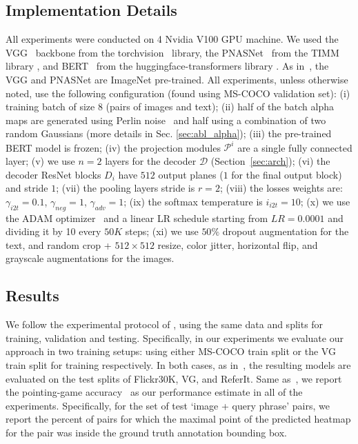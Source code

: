 \documentclass[10pt,twocolumn,letterpaper]{article}
\newcommand\secvspace{\vspace{-0.0cm}}
\begin{document}
\subsection{Implementation Details}\label{sec:impl_details}
\secvspace
All experiments were conducted on 4 Nvidia V100 GPU machine. We used the VGG~\cite{simonyan2014very} backbone from the torchvision~\cite{marcel2010torchvision} library, the PNASNet~\cite{liu2018progressive} from the TIMM library \cite{rw2019timm}, and BERT~\cite{devlin2018bert} from the huggingface-transformers library \cite{wolf-etal-2020-transformers}.
As in~\cite{akbari2019multi}, the VGG and PNASNet are ImageNet pre-trained.
All experiments, unless otherwise noted, use the following configuration (found using MS-COCO validation set):
(i) training batch of size $8$ (pairs of images and text); 
(ii) half of the batch alpha maps are generated using Perlin noise~\cite{perlin1985image} and half using a combination of two random Gaussians (more details in Sec. \ref{sec:abl_alpha});
(iii) the pre-trained BERT model is frozen;
(iv) the projection modules $\mathcal{P}^i$ are a single fully connected layer;
(v) we use $n=2$ layers for the decoder $\mathcal{D}$ (Section~\ref{sec:arch}); 
(vi) the decoder ResNet blocks $D_i$ have $512$ output planes ($1$ for the final output block) and stride $1$;
(vii) the pooling layers stride is $r=2$; 
(viii) the losses weights are: $\gamma_{i2t}=0.1$, $\gamma_{neg}=1$, $\gamma_{adv}=1$; 
(ix) the softmax temperature is $i_{i2t}=10$;
(x) we use the ADAM optimizer~\cite{kingma2014adam} and a linear LR schedule starting from $LR=0.0001$ and dividing it by 10 every $50K$ steps; 
(xi) we use $50\%$ dropout augmentation for the text, and random crop + $512\times512$ resize, color jitter, horizontal flip, and grayscale augmentations for the images. 


 \secvspace
\subsection{Results}\label{sec:results}
\secvspace
We follow the experimental protocol of \cite{akbari2019multi}, using the same data and splits for training, validation and testing. Specifically, in our experiments we evaluate our approach in two training setups: using either MS-COCO train split or the VG train split for training respectively. In both cases, as in~\cite{akbari2019multi}, the resulting models are evaluated on the test splits of Flickr30K, VG, and ReferIt. Same as~\cite{akbari2019multi}, we report the pointing-game accuracy~\cite{zhang2016top} as our performance estimate in all of the experiments. Specifically, for the set of test `image + query phrase' pairs, we report the percent of pairs for which the maximal point of the predicted heatmap for the pair was inside the ground truth annotation bounding box.
\end{document}
